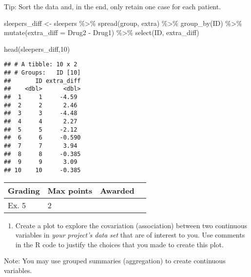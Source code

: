 \documentclass[
]{article}
\newenvironment{Shaded}{\begin{snugshade}}{\end{snugshade}}
\newcommand{\AttributeTok}[1]{\textcolor[rgb]{0.77,0.63,0.00}{#1}}
\newcommand{\DecValTok}[1]{\textcolor[rgb]{0.00,0.00,0.81}{#1}}
\newcommand{\FunctionTok}[1]{\textcolor[rgb]{0.00,0.00,0.00}{#1}}
\newcommand{\NormalTok}[1]{#1}
\newcommand{\OtherTok}[1]{\textcolor[rgb]{0.56,0.35,0.01}{#1}}
\newcommand{\SpecialCharTok}[1]{\textcolor[rgb]{0.00,0.00,0.00}{#1}}
\newcommand{\StringTok}[1]{\textcolor[rgb]{0.31,0.60,0.02}{#1}}
\providecommand{\tightlist}{%
  \setlength{\itemsep}{0pt}\setlength{\parskip}{0pt}}
\begin{document}
Tip: Sort the data and, in the end, only retain one case for each
patient.

\begin{Shaded}
\begin{Highlighting}[]
\NormalTok{sleepers\_diff }\OtherTok{\textless{}{-}}\NormalTok{ sleepers }\SpecialCharTok{\%\textgreater{}\%} 
  \FunctionTok{spread}\NormalTok{(group, extra) }\SpecialCharTok{\%\textgreater{}\%} 
  \FunctionTok{group\_by}\NormalTok{(ID) }\SpecialCharTok{\%\textgreater{}\%} 
  \FunctionTok{mutate}\NormalTok{(}\AttributeTok{extra\_diff =} \StringTok{\textasciigrave{}}\AttributeTok{Drug2}\StringTok{\textasciigrave{}} \SpecialCharTok{{-}} \StringTok{\textasciigrave{}}\AttributeTok{Drug1}\StringTok{\textasciigrave{}}\NormalTok{) }\SpecialCharTok{\%\textgreater{}\%} 
  \FunctionTok{select}\NormalTok{(ID, extra\_diff) }

\FunctionTok{head}\NormalTok{(sleepers\_diff,}\DecValTok{10}\NormalTok{)}
\end{Highlighting}
\end{Shaded}

\begin{verbatim}
## # A tibble: 10 x 2
## # Groups:   ID [10]
##       ID extra_diff
##    <dbl>      <dbl>
##  1     1     -4.59 
##  2     2      2.46 
##  3     3     -4.48 
##  4     4      2.27 
##  5     5     -2.12 
##  6     6     -0.590
##  7     7      3.94 
##  8     8     -0.385
##  9     9      3.09 
## 10    10     -0.385
\end{verbatim}

\begin{longtable}[]{@{}llll@{}}
\toprule()
Grading & Max points & Awarded & \\
\midrule()
\endhead
Ex. 5 & 2 & & \\
\bottomrule()
\end{longtable}

\begin{enumerate}
\def\labelenumi{\arabic{enumi}.}
\setcounter{enumi}{5}
\tightlist
\item
  Create a plot to explore the covariation (association) between two
  continuous variables in \emph{your project's data set} that are of
  interest to you. Use comments in the R code to justify the choices
  that you made to create this plot.
\end{enumerate}

Note: You may use grouped summaries (aggregation) to create continuous
variables.
\end{document}

